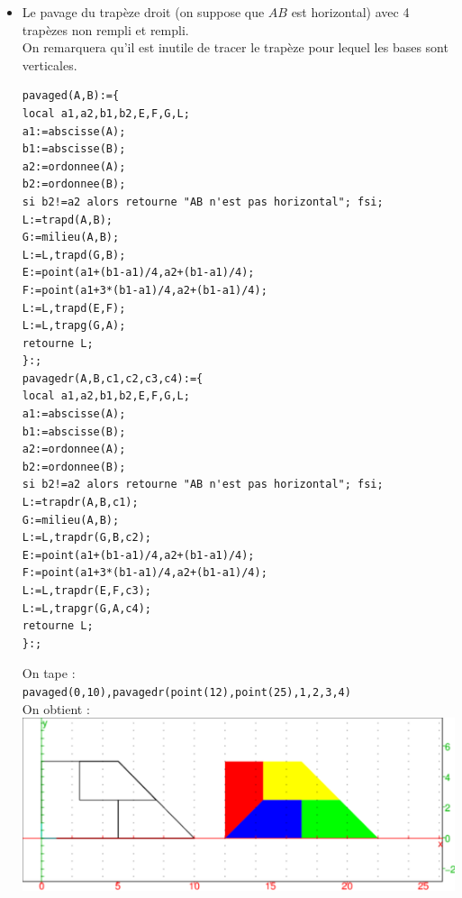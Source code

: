 \documentclass[a4paper,11pt]{book}
\begin{document}
\begin{itemize}
\item Le pavage  du trap\`eze droit  (on suppose que $AB$ est horizontal) avec 
4 trap\`ezes non rempli et rempli.\\
On remarquera qu'il est inutile de tracer le trap\`eze pour lequel les bases 
sont verticales.  
\begin{verbatim}
pavaged(A,B):={
local a1,a2,b1,b2,E,F,G,L;
a1:=abscisse(A);
b1:=abscisse(B);
a2:=ordonnee(A);
b2:=ordonnee(B);
si b2!=a2 alors retourne "AB n'est pas horizontal"; fsi;
L:=trapd(A,B);
G:=milieu(A,B);
L:=L,trapd(G,B);
E:=point(a1+(b1-a1)/4,a2+(b1-a1)/4);
F:=point(a1+3*(b1-a1)/4,a2+(b1-a1)/4);
L:=L,trapd(E,F);
L:=L,trapg(G,A);
retourne L;
}:;
pavagedr(A,B,c1,c2,c3,c4):={
local a1,a2,b1,b2,E,F,G,L;
a1:=abscisse(A);
b1:=abscisse(B);
a2:=ordonnee(A);
b2:=ordonnee(B);
si b2!=a2 alors retourne "AB n'est pas horizontal"; fsi;
L:=trapdr(A,B,c1);
G:=milieu(A,B);
L:=L,trapdr(G,B,c2);
E:=point(a1+(b1-a1)/4,a2+(b1-a1)/4);
F:=point(a1+3*(b1-a1)/4,a2+(b1-a1)/4);
L:=L,trapdr(E,F,c3);
L:=L,trapgr(G,A,c4);
retourne L;
}:;
\end{verbatim}
On tape :\\
{\tt pavaged(0,10),pavagedr(point(12),point(25),1,2,3,4)}\\
On obtient :\\
\includegraphics[width=\textwidth]{pavagedr}


\end{itemize}
\end{document}
